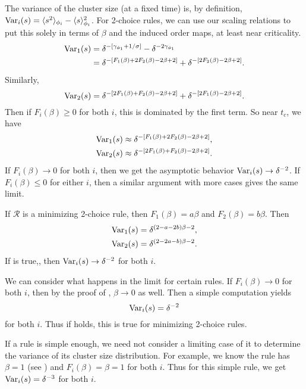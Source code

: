 \documentclass[twoside,10pt]{article}
\begin{document}
The variance of the cluster size (at a fixed time) is, by definition, $\operatorname{Var}_i(s) = \langle s^2 \rangle_{\phi_i} - \langle s \rangle^2_{\phi_i}$. For 2-choice rules, we can use our scaling relations to put this solely in terms of $\beta$ and the induced order maps, at least near criticality.
\begin{align*}
        \operatorname{Var}_1(s) &= \delta^{-[\gamma_{\phi_1} + 1/\sigma]} - \delta^{-2\gamma_{\phi_1}} \\
                  &= \delta^{-[F_1(\beta)+2F_2(\beta)-2\beta+2]} + \delta^{-[2F_2(\beta)-2\beta+2]}.
\end{align*}
Similarly,
\[
        \operatorname{Var}_2(s) = \delta^{-[2F_1(\beta)+F_2(\beta)-2\beta+2]} + \delta^{-[2F_1(\beta)-2\beta+2]}.
\]
Then if $F_i(\beta) \geq 0$ for both $i$, this is dominated by the first term. So near $t_c$, we have
\begin{align*}
        \operatorname{Var}_1(s) &\approx \delta^{-[F_1(\beta)+2F_2(\beta)-2\beta+2]}, \\
        \operatorname{Var}_2(s) &\approx \delta^{-[2F_1(\beta)+F_2(\beta)-2\beta+2]}.
\end{align*}
If $F_{i}(\beta)\to 0$ for both $i$, then we get the asymptotic behavior $\operatorname{Var}_i(s) \to \delta^{-2}$. If $F_{i}(\beta) \leq 0$ for either $i$, then a similar argument with more cases gives the same limit.

\begin{ex}[]
        If $\mathcal{R}$ is a minimizing 2-choice rule, then $F_1(\beta) = a \beta$ and $F_2(\beta)=b \beta$. Then
        \begin{align*}
                \operatorname{Var}_1(s) &= \delta^{(2-a-2b)\beta-2},\\
                \operatorname{Var}_2(s) &= \delta^{(2-2a-b)\beta-2}.
        \end{align*}
        If  is true,, then $\operatorname{Var}_i(s) \to \delta^{-2}$ for both $i$.
\end{ex}

We can consider what happens in the limit for certain rules. If $F_{i}(\beta)\to 0$ for both $i$, then by the proof of , $\beta\to 0$ as well. Then a simple computation yields
\[
	\operatorname{Var}_{i}(s) = \delta^{-2}
\] for both $i$. Thus if  holds, this is true for minimizing 2-choice rules.

If a rule is simple enough, we need not consider a limiting case of it to determine the variance of its cluster size distribution. For example, we know the \ER rule has $\beta=1$ (see ) and $F_{i}(\beta) = \beta = 1$ for both $i$. Thus for this simple rule, we get $\operatorname{Var}_{i}(s) = \delta^{-3}$ for both $i$.
\end{document}
